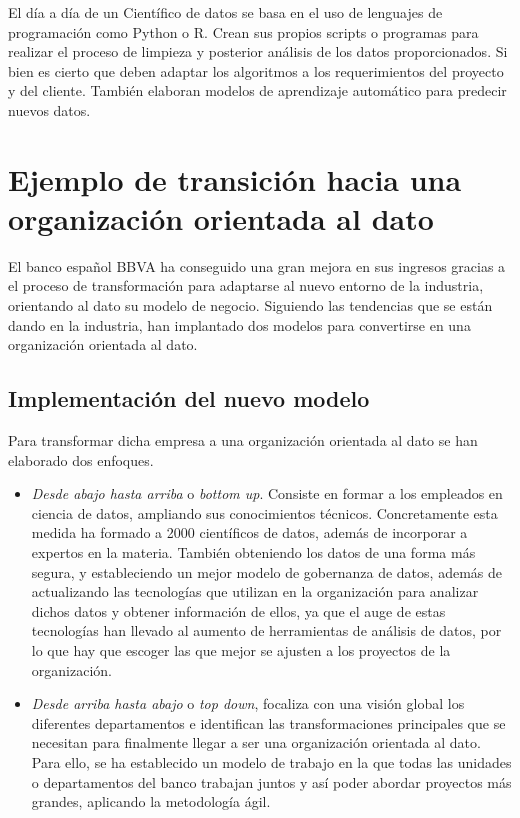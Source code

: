 \documentclass{article}
\begin{document}
El día a día de un Científico de datos se basa en el uso de lenguajes de programación como Python o R.  Crean sus propios scripts o programas para realizar el proceso de limpieza y posterior análisis de los datos proporcionados. Si bien es cierto que deben adaptar los algoritmos a los requerimientos del proyecto y del cliente. También elaboran modelos de aprendizaje automático para predecir nuevos datos.

\section{Ejemplo de transición hacia una organización orientada al dato}

El banco español BBVA ha conseguido una gran mejora en sus ingresos gracias a el proceso de transformación para adaptarse al nuevo entorno de la industria, orientando al dato su modelo de negocio. Siguiendo las tendencias que se están dando en la industria, han implantado dos modelos para convertirse en una organización orientada al dato.
\subsection{Implementación del nuevo modelo}
Para transformar dicha empresa a una organización orientada al dato se han elaborado dos enfoques.

\begin{itemize}
\item \textit{Desde abajo hasta arriba} o \textit{bottom up}. Consiste en formar a los empleados en ciencia de datos, ampliando sus conocimientos técnicos. Concretamente esta medida ha formado a 2000 científicos de datos, además de incorporar a expertos en la materia. También obteniendo los datos de una forma más segura, y estableciendo un mejor modelo de gobernanza de datos, además de actualizando las tecnologías que utilizan en la organización para analizar dichos datos y obtener información de ellos, ya que el auge de estas tecnologías han llevado al aumento de herramientas de análisis de datos, por lo que hay que escoger las que mejor se ajusten a los proyectos de la organización.
\item \textit{Desde arriba hasta abajo} o \textit{top down}, focaliza con una visión global los diferentes departamentos e identifican las transformaciones principales que se necesitan para finalmente llegar a ser una organización orientada al dato. Para ello, se ha establecido un modelo de trabajo en la que todas las unidades o departamentos del banco trabajan juntos y así poder abordar proyectos más grandes, aplicando la metodología ágil.
\end{itemize}
\end{document}
